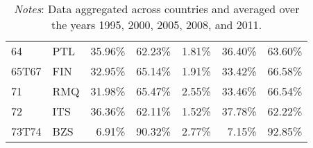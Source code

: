 \documentclass[a4paper,11pt]{article}
\begin{document}
\begin{table}[h]
\begin{tabular}{llrrrrr}
    64    & PTL   & 35.96\% & 62.23\% & 1.81\% & 36.40\% & 63.60\% \\
    65T67 & FIN   & 32.95\% & 65.14\% & 1.91\% & 33.42\% & 66.58\% \\
    71    & RMQ   & 31.98\% & 65.47\% & 2.55\% & 33.46\% & 66.54\% \\
    72    & ITS   & 36.36\% & 62.11\% & 1.52\% & 37.78\% & 62.22\% \\
    73T74 & BZS   & 6.91\% & 90.32\% & 2.77\% & 7.15\% & 92.85\% \\
  \bottomrule
   \end{tabular}
         \caption*{\textit{Notes}: Data aggregated across countries and averaged over the years 1995, 2000, 2005, 2008, and 2011.}
\end{table}
\end{document}
